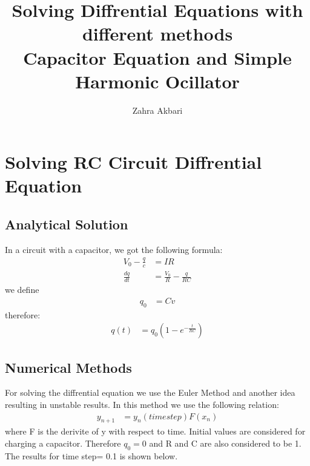 \documentclass[12pt,a4paper]{article}
\title{Solving Diffrential Equations with different methods\\
Capacitor Equation and Simple Harmonic Ocillator}
\author{Zahra Akbari}
\date{}
\begin{document}
	\maketitle
	\section{Solving RC Circuit Diffrential Equation }
	\subsection*{Analytical Solution}
	In a circuit with a capacitor, we got the following formula:
	\begin{align*}
		V_0-\frac{q}{c} &= IR \\
		\frac{dq}{dt} &= \frac{V_0}{R} - \frac{q}{RC}
	\end{align*}
	we define
	\begin{align*}
		q_0 &= Cv
	\end{align*}
	therefore:
	\begin{align*}
		q(t)&=q_0 (1-e^{-\frac{t}{RC}})
	\end{align*}

	\subsection*{Numerical Methods}
	For solving the diffrential equation we use the Euler Method and another idea resulting in unstable results.
	In this method we use the following relation:
	\begin{align*}
		y_{n+1} &= y_n (time step) F(x_n)
	\end{align*}
	where F is the derivite of y with respect to time. Initial values are considered for charging a capacitor. Therefore $q_0=0$ and R and C are also considered to be 1. The results for time step= 0.1 is shown below.
\end{document}
